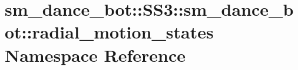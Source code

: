 \hypertarget{namespacesm__dance__bot_1_1SS3_1_1sm__dance__bot_1_1radial__motion__states}{}\section{sm\+\_\+dance\+\_\+bot\+:\+:S\+S3\+:\+:sm\+\_\+dance\+\_\+bot\+:\+:radial\+\_\+motion\+\_\+states Namespace Reference}
\label{namespacesm__dance__bot_1_1SS3_1_1sm__dance__bot_1_1radial__motion__states}
